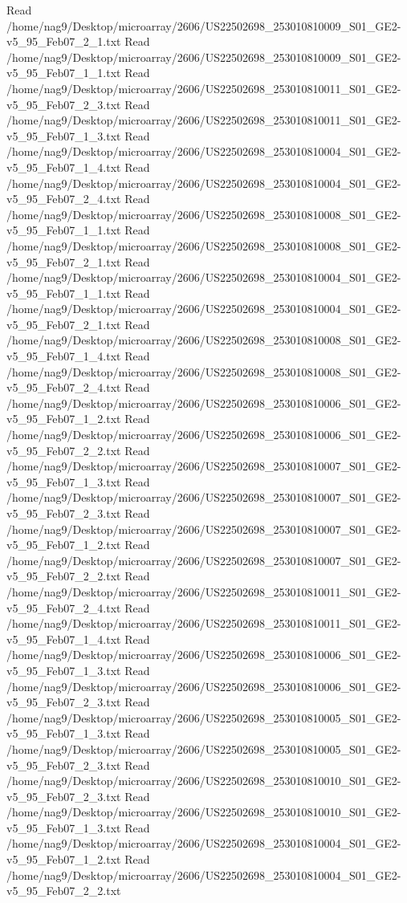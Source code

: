 \documentclass[titlepage]{article}
\begin{document}
\begin{Schunk}
\begin{Soutput}
Read /home/nag9/Desktop/microarray/2606/US22502698_253010810009_S01_GE2-v5_95_Feb07_2_1.txt 
Read /home/nag9/Desktop/microarray/2606/US22502698_253010810009_S01_GE2-v5_95_Feb07_1_1.txt 
Read /home/nag9/Desktop/microarray/2606/US22502698_253010810011_S01_GE2-v5_95_Feb07_2_3.txt 
Read /home/nag9/Desktop/microarray/2606/US22502698_253010810011_S01_GE2-v5_95_Feb07_1_3.txt 
Read /home/nag9/Desktop/microarray/2606/US22502698_253010810004_S01_GE2-v5_95_Feb07_1_4.txt 
Read /home/nag9/Desktop/microarray/2606/US22502698_253010810004_S01_GE2-v5_95_Feb07_2_4.txt 
Read /home/nag9/Desktop/microarray/2606/US22502698_253010810008_S01_GE2-v5_95_Feb07_1_1.txt 
Read /home/nag9/Desktop/microarray/2606/US22502698_253010810008_S01_GE2-v5_95_Feb07_2_1.txt 
Read /home/nag9/Desktop/microarray/2606/US22502698_253010810004_S01_GE2-v5_95_Feb07_1_1.txt 
Read /home/nag9/Desktop/microarray/2606/US22502698_253010810004_S01_GE2-v5_95_Feb07_2_1.txt 
Read /home/nag9/Desktop/microarray/2606/US22502698_253010810008_S01_GE2-v5_95_Feb07_1_4.txt 
Read /home/nag9/Desktop/microarray/2606/US22502698_253010810008_S01_GE2-v5_95_Feb07_2_4.txt 
Read /home/nag9/Desktop/microarray/2606/US22502698_253010810006_S01_GE2-v5_95_Feb07_1_2.txt 
Read /home/nag9/Desktop/microarray/2606/US22502698_253010810006_S01_GE2-v5_95_Feb07_2_2.txt 
Read /home/nag9/Desktop/microarray/2606/US22502698_253010810007_S01_GE2-v5_95_Feb07_1_3.txt 
Read /home/nag9/Desktop/microarray/2606/US22502698_253010810007_S01_GE2-v5_95_Feb07_2_3.txt 
Read /home/nag9/Desktop/microarray/2606/US22502698_253010810007_S01_GE2-v5_95_Feb07_1_2.txt 
Read /home/nag9/Desktop/microarray/2606/US22502698_253010810007_S01_GE2-v5_95_Feb07_2_2.txt 
Read /home/nag9/Desktop/microarray/2606/US22502698_253010810011_S01_GE2-v5_95_Feb07_2_4.txt 
Read /home/nag9/Desktop/microarray/2606/US22502698_253010810011_S01_GE2-v5_95_Feb07_1_4.txt 
Read /home/nag9/Desktop/microarray/2606/US22502698_253010810006_S01_GE2-v5_95_Feb07_1_3.txt 
Read /home/nag9/Desktop/microarray/2606/US22502698_253010810006_S01_GE2-v5_95_Feb07_2_3.txt 
Read /home/nag9/Desktop/microarray/2606/US22502698_253010810005_S01_GE2-v5_95_Feb07_1_3.txt 
Read /home/nag9/Desktop/microarray/2606/US22502698_253010810005_S01_GE2-v5_95_Feb07_2_3.txt 
Read /home/nag9/Desktop/microarray/2606/US22502698_253010810010_S01_GE2-v5_95_Feb07_2_3.txt 
Read /home/nag9/Desktop/microarray/2606/US22502698_253010810010_S01_GE2-v5_95_Feb07_1_3.txt 
Read /home/nag9/Desktop/microarray/2606/US22502698_253010810004_S01_GE2-v5_95_Feb07_1_2.txt 
Read /home/nag9/Desktop/microarray/2606/US22502698_253010810004_S01_GE2-v5_95_Feb07_2_2.txt 

\end{Soutput}
\end{Schunk}
\end{document}
